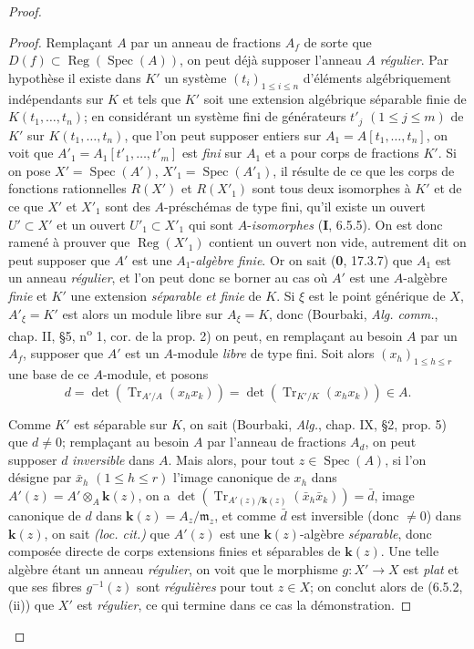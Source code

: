\begin{proof}
\begin{proof}
Remplaçant $A$ par un anneau de fractions $A_f$ de sorte que
$D(f)\subset\operatorname{Reg}(\operatorname{Spec}(A))$, on peut déjà
supposer l'anneau $A$ \emph{régulier}. Par hypothèse il existe dans $K'$ un système
$(t_i)_{1\leq i\leq n}$ d'éléments algébriquement indépendants sur $K$ et
tels que $K'$ soit une extension algébrique séparable finie de
$K(t_1,\ldots,t_n)$; en considérant un système fini
de générateurs $t'_j$ $(1\leq j\leq m)$ de $K'$ sur
$K(t_1,\ldots,t_n)$, que l'on peut supposer entiers sur
$A_1=A[t_1,\ldots,t_n]$, on voit que
$A'_1=A_1[t'_1,\ldots,t'_m]$ est \emph{fini} sur $A_1$ et a pour corps de fractions
$K'$. Si on pose $X'=\operatorname{Spec}(A')$,
$X'_1=\operatorname{Spec}(A'_1)$, il résulte de ce que les corps de fonctions
rationnelles $R(X')$ et $R(X'_1)$ sont tous deux isomorphes à $K'$ et de ce
que $X'$ et $X'_1$ sont des $A$-préschémas de type fini, qu'il existe un
ouvert $U'\subset X'$ et un ouvert $U'_1\subset X'_1$ qui sont
$A$-\emph{isomorphes} (\textbf{I}, 6.5.5). On est donc ramené à prouver que
$\operatorname{Reg}(X'_1)$ contient un ouvert non vide, autrement dit on
peut supposer que $A'$ est une $A_1$-\emph{algèbre finie}. Or on sait (\textbf{0}, 17.3.7)
que $A_1$ est un anneau \emph{régulier}, et l'on peut donc se borner au cas où $A'$
est une $A$-algèbre \emph{finie} et $K'$ une extension \emph{séparable et finie} de $K$.
Si $\xi$ est le point générique de $X$, $A'_\xi=K'$ est alors un module
libre sur $A_\xi=K$, donc (Bourbaki, \emph{Alg. comm.}, chap. II, \S5,
n\textsuperscript{o} 1,
cor. de la prop. 2) on peut, en remplaçant au besoin $A$ par un $A_f$,
supposer que $A'$ est un $A$-module \emph{libre} de type fini. Soit alors
$(x_h)_{1\leq h\leq r}$ une base de ce $A$-module, et posons
\[
d=\det(\operatorname{Tr}_{A'/A}(x_hx_k))=
\det(\operatorname{Tr}_{K'/K}(x_hx_k))\in A.
\]

Comme $K'$ est séparable sur $K$, on sait (Bourbaki, \emph{Alg.}, chap. IX, \S2,
prop. 5) que $d\neq0$; remplaçant au besoin $A$ par l'anneau de fractions
$A_d$, on peut supposer $d$ \emph{inversible} dans $A$. Mais alors, pour tout
$z\in\operatorname{Spec}(A)$, si l'on désigne par $\bar x_h$
$(1\leq h\leq r)$ l'image canonique de $x_h$ dans
$A'(z)=A'\otimes_A \boldsymbol{k}(z)$, on a
$\det(\operatorname{Tr}_{A'(z)/\mathbf{k}(z)}(\bar x_h\bar x_k))=\bar d$, image
canonique de $d$ dans $\boldsymbol{k}(z)=A_z/\mathfrak m_z$, et comme $\bar d$ est
inversible (donc $\neq0$) dans $\boldsymbol{k}(z)$, on sait \emph{(loc. cit.)} que $A'(z)$ est
une $\boldsymbol{k}(z)$-algèbre \emph{séparable}, donc composée directe de corps extensions
finies et séparables de $\boldsymbol{k}(z)$. Une telle algèbre étant un anneau \emph{régulier},
on voit que le morphisme $g:X'\to X$ est \emph{plat} et que ses fibres $g^{-1}(z)$
sont \emph{régulières} pour tout $z\in X$; on conclut alors de (6.5.2, (ii)) que
$X'$ est \emph{régulier}, ce qui termine dans ce cas la démonstration.
\end{proof}


\end{proof}
